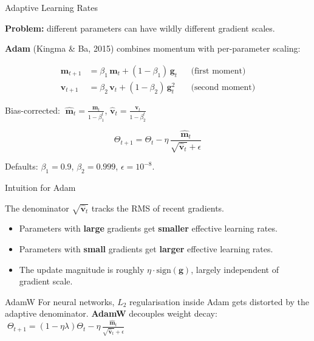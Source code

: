 \documentclass[aspectratio=169, professionalfonts]{beamer}
\begin{document}
\begin{frame}{Adaptive Learning Rates}

\textbf{Problem:} different parameters can have wildly different
gradient scales.

\bigskip

\textbf{Adam} (Kingma \& Ba, 2015) combines momentum with
per-parameter scaling:

\begin{align*}
\mathbf{m}_{t+1} &= \beta_1\,\mathbf{m}_t
  + (1-\beta_1)\,\mathbf{g}_t
  &&\text{(first moment)} \\[4pt]
\mathbf{v}_{t+1} &= \beta_2\,\mathbf{v}_t
  + (1-\beta_2)\,\mathbf{g}_t^2
  &&\text{(second moment)}
\end{align*}

Bias-corrected:
$\;\hat{\mathbf{m}}_t = \frac{\mathbf{m}_t}{1-\beta_1^t}$,
\quad
$\hat{\mathbf{v}}_t = \frac{\mathbf{v}_t}{1-\beta_2^t}$

\bigskip

$$\boxed{\Theta_{t+1}
  = \Theta_t
  - \eta\,\frac{\hat{\mathbf{m}}_t}
               {\sqrt{\hat{\mathbf{v}}_t}+\epsilon}}$$

Defaults: $\beta_1=0.9$, $\beta_2=0.999$, $\epsilon=10^{-8}$.

\end{frame}

\begin{frame}{Intuition for Adam}

The denominator $\sqrt{\hat{\mathbf{v}}_t}$ tracks the RMS
of recent gradients.

\bigskip

\begin{itemize}
  \item Parameters with \textbf{large} gradients get \textbf{smaller}
        effective learning rates.
  \item Parameters with \textbf{small} gradients get \textbf{larger}
        effective learning rates.
  \item The update magnitude is roughly
        $\eta\cdot\text{sign}(\mathbf{g})$, largely
        independent of gradient scale.
\end{itemize}

\bigskip

\begin{alertblock}{AdamW}
For neural networks, $L_2$ regularisation inside Adam gets
distorted by the adaptive denominator.
\textbf{AdamW} decouples weight decay:
$\;\Theta_{t+1} = (1-\eta\lambda)\Theta_t
  - \eta\,\frac{\hat{\mathbf{m}}_t}
               {\sqrt{\hat{\mathbf{v}}_t}+\epsilon}$
\end{alertblock}

\end{frame}
\end{document}
